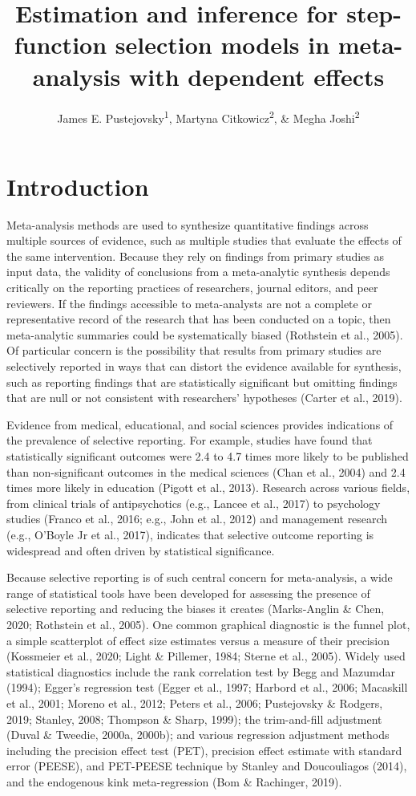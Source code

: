 \documentclass[
  american,
  man, donotrepeattitle,floatsintext]{apa7}
\title{Estimation and inference for step-function selection models in meta-analysis with dependent effects}
\author{James E. Pustejovsky\textsuperscript{1}, Martyna Citkowicz\textsuperscript{2}, \& Megha Joshi\textsuperscript{2}}
\date{}
\affiliation{\vspace{0.5cm}\textsuperscript{1} University of Wisconsin-Madison\\\textsuperscript{2} American Institutes for Research}
\begin{document}
\maketitle

\section{Introduction}\label{introduction}

Meta-analysis methods are used to synthesize quantitative findings across multiple sources of evidence, such as multiple studies that evaluate the effects of the same intervention.
Because they rely on findings from primary studies as input data, the validity of conclusions from a meta-analytic synthesis depends critically on the reporting practices of researchers, journal editors, and peer reviewers.
If the findings accessible to meta-analysts are not a complete or representative record of the research that has been conducted on a topic, then meta-analytic summaries could be systematically biased (Rothstein et al., 2005).
Of particular concern is the possibility that results from primary studies are selectively reported in ways that can distort the evidence available for synthesis, such as reporting findings that are statistically significant but omitting findings that are null or not consistent with researchers' hypotheses (Carter et al., 2019).

Evidence from medical, educational, and social sciences provides indications of the prevalence of selective reporting. For example, studies have found that statistically significant outcomes were 2.4 to 4.7 times more likely to be published than non-significant outcomes in the medical sciences (Chan et al., 2004) and 2.4 times more likely in education (Pigott et al., 2013). Research across various fields, from clinical trials of antipsychotics (e.g., Lancee et al., 2017) to psychology studies (Franco et al., 2016; e.g., John et al., 2012) and management research (e.g., O'Boyle Jr et al., 2017), indicates that selective outcome reporting is widespread and often driven by statistical significance.

Because selective reporting is of such central concern for meta-analysis, a wide range of statistical tools have been developed for assessing the presence of selective reporting and reducing the biases it creates (Marks‐Anglin \& Chen, 2020; Rothstein et al., 2005).
One common graphical diagnostic is the funnel plot, a simple scatterplot of effect size estimates versus a measure of their precision (Kossmeier et al., 2020; Light \& Pillemer, 1984; Sterne et al., 2005). Widely used statistical diagnostics include the rank correlation test by Begg and Mazumdar (1994); Egger's regression test (Egger et al., 1997; Harbord et al., 2006; Macaskill et al., 2001; Moreno et al., 2012; Peters et al., 2006; Pustejovsky \& Rodgers, 2019; Stanley, 2008; Thompson \& Sharp, 1999); the trim-and-fill adjustment (Duval \& Tweedie, 2000a, 2000b); and various regression adjustment methods including the precision effect test (PET), precision effect estimate with standard error (PEESE), and PET-PEESE technique by Stanley and Doucouliagos (2014), and the endogenous kink meta-regression (Bom \& Rachinger, 2019).
\end{document}
